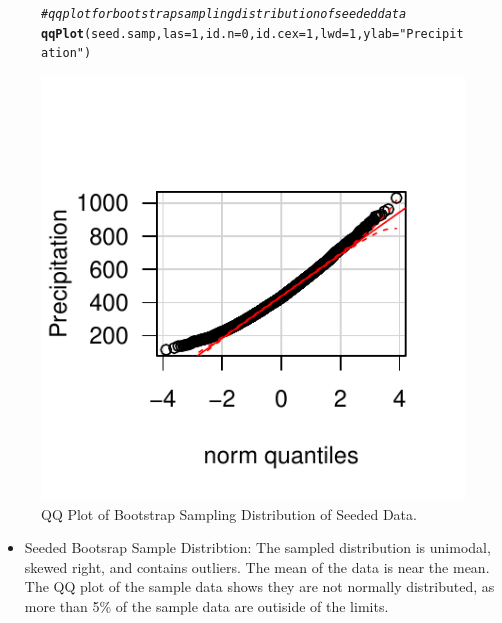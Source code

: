 \documentclass{article}\usepackage[]{graphicx}\usepackage[]{color}
\makeatletter
\def\maxwidth{ %
  \ifdim\Gin@nat@width>\linewidth
    \linewidth
  \else
    \Gin@nat@width
  \fi
}
\newcommand{\hlnum}[1]{\textcolor[rgb]{0.686,0.059,0.569}{#1}}%
\newcommand{\hlstr}[1]{\textcolor[rgb]{0.192,0.494,0.8}{#1}}%
\newcommand{\hlcom}[1]{\textcolor[rgb]{0.678,0.584,0.686}{\textit{#1}}}%
\newcommand{\hlstd}[1]{\textcolor[rgb]{0.345,0.345,0.345}{#1}}%
\newcommand{\hlkwc}[1]{\textcolor[rgb]{0.333,0.667,0.333}{#1}}%
\newcommand{\hlkwd}[1]{\textcolor[rgb]{0.737,0.353,0.396}{\textbf{#1}}}%
\newenvironment{kframe}{%
 \def\at@end@of@kframe{}%
 \ifinner\ifhmode%
  \def\at@end@of@kframe{\end{minipage}}%
  \begin{minipage}{\columnwidth}%
 \fi\fi%
 \def\FrameCommand##1{\hskip\@totalleftmargin \hskip-\fboxsep
 \colorbox{shadecolor}{##1}\hskip-\fboxsep
     \hskip-\linewidth \hskip-\@totalleftmargin \hskip\columnwidth}%
 \MakeFramed {\advance\hsize-\width
   \@totalleftmargin\z@ \linewidth\hsize
   \@setminipage}}%
 {\par\unskip\endMakeFramed%
 \at@end@of@kframe}
\newenvironment{knitrout}{}{} %
\makeatother
\begin{document}
\begin{figure}[H]  \begin{center}
\begin{knitrout}
\color{fgcolor}\begin{kframe}
\begin{alltt}
\hlcom{# qq plot for bootstrap sampling distribution of seeded data}
\hlkwd{qqPlot}\hlstd{(seed.samp,} \hlkwc{las} \hlstd{=} \hlnum{1}\hlstd{,} \hlkwc{id.n} \hlstd{=} \hlnum{0}\hlstd{,} \hlkwc{id.cex} \hlstd{=} \hlnum{1}\hlstd{,} \hlkwc{lwd} \hlstd{=} \hlnum{1}\hlstd{,} \hlkwc{ylab} \hlstd{=} \hlstr{"Precipitation"}\hlstd{)}
\end{alltt}
\end{kframe}
\includegraphics[width=\maxwidth]{figure/1a_qq_seedsamp} 

\end{knitrout}
\end{center} \caption{QQ Plot of Bootstrap Sampling Distribution of Seeded Data.} \end{figure}

\begin{itemize}
\item Seeded Bootsrap Sample Distribtion:  The sampled distribution is unimodal, skewed right, and contains outliers.  The mean of the data is near the mean.  The QQ plot of the sample data shows they are not normally distributed, as more than 5\% of the sample data are outiside of the limits.
\end{itemize}
\end{document}
